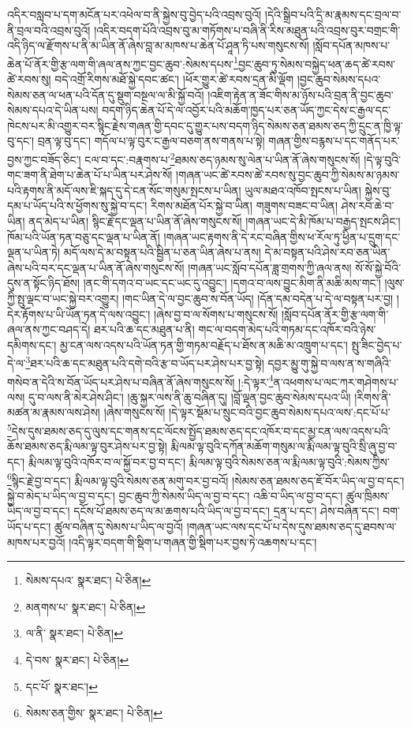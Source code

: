 འདིར་བསླབ་པ་དག་མངོན་པར་འཕེལ་བ་ནི་སྐྱེས་བུ་བྱེད་པའི་འབྲས་བུའོ། །དེའི་སྒྲིབ་པའི་དྲི་མ་རྣམས་དང་བྲལ་བ་ནི་བྲལ་བའི་འབྲས་བུའོ། །འདིར་བདག་པོའི་འབྲས་བུ་མ་གཏོགས་པ་བཞི་ནི་རིས་མཐུན་པའི་འབྲས་བུར་བགྲང་གི་འདི་ཉིད་ལ་རྫོགས་པ་ནི་མ་ཡིན་ནོ་ཞེས་བླ་མ་མཁས་པ་ཆེན་པོ་ཤཱན་ཏི་པས་གསུངས་སོ། །སློབ་དཔོན་མཁས་པ་ཆེན་པོ་ནོར་གྱི་རྩ་ལག་གི་ཞལ་ནས་ཀྱང་བྱང་ཆུབ་:སེམས་དཔས་\footnote{སེམས་དཔའ་  སྣར་ཐང་།  པེ་ཅིན། }བྱང་ཆུབ་ཏུ་སེམས་བསྐྱེད་ཕན་ཆད་ཚེ་རབས་ཚེ་རབས་སུ། བདེ་འགྲོ་རིགས་མཐོ་སྐྱེ་དབང་ཚང་། །ཕོར་གྱུར་ཚེ་རབས་དྲན་མི་ལྡོག །བྱང་ཆུབ་སེམས་དཔའ་སེམས་ཅན་ལ་ཕན་པའི་དོན་དུ་སྡུག་བསྔལ་ལ་མི་སྐྱོ་བའོ། །འཇིག་རྟེན་ན་ཟོང་གིས་མ་ཉོས་པའི་བྲན་ནི་བྱང་ཆུབ་སེམས་དཔའ་དེ་ཡིན་པས། བདག་ཉིད་ཆེན་པོ་དེ་ལ་འབྱོར་པའི་མཆོག་ཁྱད་པར་ཅན་ཡོད་ཀྱང་དེས་ང་རྒྱལ་དང་ཁེངས་པར་མི་འགྱུར་བར་སྙིང་རྗེས་གཞན་གྱི་དབང་དུ་གྱུར་པས་བདག་ཉིད་སེམས་ཅན་ཐམས་ཅད་ཀྱི་དྲུང་ན་ཁྱི་ལྟ་བུ་དང་། བྲན་ལྟ་བུ་དང་། གདོལ་པ་ལྟ་བུར་ང་རྒྱལ་བཅག་ནས་གནས་པ་སྟེ། གཞན་གྱིས་བརྙས་པ་དང་གནོད་པར་བྱས་ཀྱང་བཟོད་ཅིང་། ངལ་བ་དང་:བརྣགས་པ་\footnote{མནགས་པ་  སྣར་ཐང་།  པེ་ཅིན། }ཐམས་ཅད་ཉམས་སུ་ལེན་པ་ཡིན་ནོ་ཞེས་གསུངས་སོ། །དེ་ལྟ་བུའི་གང་ཟག་ནི་ཐེག་པ་ཆེན་པོ་པ་ཡིན་པར་ཤེས་སོ། །གཞན་ཡང་ཚེ་རབས་ཚེ་རབས་སུ་བྱང་ཆུབ་ཀྱི་སེམས་མ་ཉམས་པའི་རྟགས་ནི་མདོ་ལས་ཇི་སྐད་དུ་དེ་ངན་སོང་གསུམ་སྤངས་པ་ཡིན། ཡུལ་མཐའ་འཁོབ་སྤངས་པ་ཡིན། སྐྱེས་བུ་དམ་པ་ཡོད་པའི་ས་ཕྱོགས་སུ་སྐྱེ་བ་དང་། རིགས་མཐོན་པོར་སྐྱེ་བ་ཡིན། གཟུགས་བཟང་བ་ཡིན། ཤེས་རབ་ཆེ་བ་ཡིན། ནད་མེད་པ་ཡིན། སྙིང་རྗེ་དང་ལྡན་པ་ཡིན་ནོ་ཞེས་གསུངས་སོ། །གཞན་ཡང་དེ་མི་ཁོམ་པ་བརྒྱད་སྤངས་ཤིང་། ཁོམ་པའི་ཡོན་ཏན་བཅུ་དང་ལྡན་པ་ཡིན་ནོ། །གཞན་ཡང་རྟགས་ནི་དེ་རང་བཞིན་གྱིས་ཕ་རོལ་ཏུ་ཕྱིན་པ་དྲུག་དང་ལྡན་པ་ཡིན་ཏེ། མདོ་ལས་དེ་མ་བསྟན་པའི་སྦྱིན་པ་ཅན་ཡིན་ཞེས་པ་ནས། དེ་མ་བསྟན་པའི་ཤེས་རབ་ཅན་ཡིན་ཞེས་པའི་བར་དང་ལྡན་པ་ཡིན་ནོ་ཞེས་གསུངས་སོ། །གཞན་ཡང་སློབ་དཔོན་ཟླ་གྲགས་ཀྱི་ཞལ་ནས། སོ་སོ་སྐྱེ་བོའི་དུས་ན་སྟོང་ཉིད་ཐོས། །ནང་གི་དགའ་བ་ཡང་དང་ཡང་དུ་འབྱུང་། །དགའ་བ་ལས་བྱུང་མིག་ནི་མཆི་མས་གང་། །ལུས་ཀྱི་སྤུ་ལྡང་བ་ཡང་སྐྱེ་བར་འགྱུར། །གང་ཡིན་དེ་ལ་བྱང་ཆུབ་ས་བོན་ཡོད། །དོན་དམ་བདེན་པ་དེ་ལ་བསྟན་པར་བྱ། །དེར་རྟོགས་པ་ཡི་ཡོན་ཏན་དེ་ལས་འབྱུང་། །ཞེས་བྱ་བ་ལ་སོགས་པ་གསུངས་སོ། །སློབ་དཔོན་ནོར་གྱི་རྩ་ལག་གི་ཞལ་ནས་ཀྱང་བཤད་དེ། ཐར་པའི་ཆ་དང་མཐུན་པ་ནི། གང་ལ་བདག་མེད་པའི་གཏམ་དང་འཁོར་བའི་ཉེས་དམིགས་དང་། མྱ་ངན་ལས་འདས་པའི་ཡོན་ཏན་གྱི་གཏམ་བརྗོད་པ་ཐོས་ན་མཆི་མ་འཁྲུག་པ་དང་། སྤུ་ཟིང་བྱེད་པ་དེ་ལ་\footnote{ལ་ནི་  སྣར་ཐང་།  པེ་ཅིན། }ཐར་པའི་ཆ་དང་མཐུན་པའི་དགེ་བའི་རྩ་བ་ཡོད་པར་ཤེས་པར་བྱ་སྟེ། དབྱར་མྱུ་གུ་སྐྱེ་བ་ལས་ན་ས་གཞིའི་གསེབ་ན་དེའི་ས་བོན་ཡོད་པར་ཤེས་པ་བཞིན་ནོ་ཞེས་གསུངས་སོ། །:དེ་ལྟར་\footnote{དེ་བས་  སྣར་ཐང་།  པེ་ཅིན། }ན་འཕགས་པ་ལང་ཀར་གཤེགས་པ་ལས། དུ་བ་ལས་ནི་མེར་ཤེས་ཤིང་། །ཆུ་སྐྱར་ལས་ནི་ཆུ་བཞིན་དུ། །བློ་ལྡན་བྱང་ཆུབ་སེམས་དཔའ་ཡི། །རིགས་ནི་མཚན་མ་རྣམས་ལས་ཤེས། །ཞེས་གསུངས་སོ། །དེ་ལྟར་སྡོམ་པ་སྲུང་བའི་བྱང་ཆུབ་སེམས་དཔའ་ལས་:དང་པོ་པ་\footnote{དང་པོ་  སྣར་ཐང་། }དེས་དུས་ཐམས་ཅད་དུ་ལུས་དང་གནས་དང་ལོངས་སྤྱོད་ཐམས་ཅད་དང་འཁོར་བ་དང་མྱ་ངན་ལས་འདས་པའི་ཆོས་ཐམས་ཅད་རྨི་ལམ་ལྟ་བུར་ཤེས་པར་བྱ་སྟེ། རྨི་ལམ་ལྟ་བུའི་དཀོན་མཆོག་གསུམ་ལ་རྨི་ལམ་ལྟ་བུའི་སྲི་ཞུ་བྱ་བ་དང་། རྨི་ལམ་ལྟ་བུའི་འཁོར་བ་ལ་སྐྱོ་བར་བྱ་བ་དང་། རྨི་ལམ་ལྟ་བུའི་སེམས་ཅན་ལ་རྨི་ལམ་ལྟ་བུའི་:སེམས་ཀྱིས་\footnote{སེམས་ཅན་གྱིས་  སྣར་ཐང་།  པེ་ཅིན། }སྙིང་རྗེ་བྱ་བ་དང་། རྨི་ལམ་ལྟ་བུའི་སེམས་ཅན་མགུ་བར་བྱ་བའོ། །སེམས་ཅན་ཐམས་ཅད་ཇོ་བོར་ཡིད་ལ་བྱ་བ་དང་། སྐྱེ་བ་མེད་པ་ཡིད་ལ་བྱ་བ་དང་། བྱང་ཆུབ་ཀྱི་སེམས་ཡིད་ལ་བྱ་བ་དང་། འཆི་བ་ཡིད་ལ་བྱ་བ་དང་། ཚུལ་ཁྲིམས་ཡིད་ལ་བྱ་བ་དང་། དངོས་པོ་ཐམས་ཅད་ལ་མ་ཆགས་པའི་ཡིད་ལ་བྱ་བ་དང་། དྲན་པ་དང་། ཤེས་བཞིན་དང་། བག་ཡོད་པ་དང་། ཚུལ་བཞིན་དུ་སེམས་པ་ཡིད་ལ་བྱའོ། །གཞན་ཡང་ལས་དང་པོ་པ་དེས་དུས་ཐམས་ཅད་དུ་ཐབས་ལ་མཁས་པར་བྱའོ། །འདི་ལྟར་བདག་གི་སྡིག་པ་གཞན་གྱི་སྡིག་པར་བྱས་ཏེ་འཆགས་པ་དང་། 